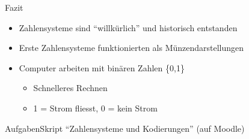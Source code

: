 \begin{frame}{Fazit}
    \begin{itemize}
    \item Zahlensysteme sind ``willkürlich'' und historisch entstanden
    \item Erste Zahlensysteme funktionierten als Münzendarstellungen
        \item Computer arbeiten mit binären Zahlen \{0,1\}
        \begin{itemize}
            \item Schnelleres Rechnen
            \item {} 1 = Strom fliesst, 0 = kein Strom
        \end{itemize}
    \end{itemize}
\end{frame}

\begin{frame}{Aufgaben}{Skript ``Zahlensysteme und Kodierungen'' (auf Moodle)}
\end{frame}